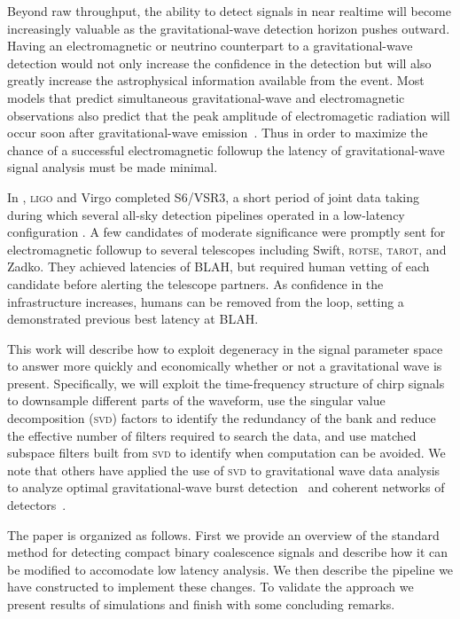 Beyond raw throughput, the ability to detect signals in near realtime will
become increasingly valuable as the gravitational-wave detection horizon pushes
outward.  Having an electromagnetic or neutrino counterpart to a
gravitational-wave detection would not only increase the confidence in the
detection but will also greatly increase the astrophysical information
available from the event. Most models that predict simultaneous
gravitational-wave and electromagnetic observations also predict that the peak
amplitude of electromagetic radiation will occur soon after gravitational-wave
emission~\cite{sylvestre2003}. Thus in order to maximize the chance of a
successful electromagnetic followup the latency of gravitational-wave signal
analysis must be made minimal.

In , \textsc{ligo} and Virgo completed S6/VSR3,
a short period of
joint data taking during which several all-sky detection pipelines operated in
a low-latency configuration \citeneeded. A few candidates of moderate
significance were promptly sent for electromagnetic followup \citeneeded{} to
several telescopes including Swift, \textsc{rotse}, \textsc{tarot}, and Zadko.
They achieved latencies of BLAH, but required human vetting of each candidate
before alerting the telescope partners. As confidence in the infrastructure
increases, humans can be removed from the loop, setting a demonstrated previous
best latency at BLAH.

This work will describe how to exploit degeneracy in the signal parameter space
to answer more quickly and economically whether or not a gravitational wave is
present.
Specifically, we will exploit the time-frequency structure of chirp
signals to downsample different parts of the waveform, use the singular value
decomposition (\textsc{svd}) factors to identify the redundancy of the bank and
reduce the effective number of filters required to search the data, and use
matched subspace filters built from \textsc{svd} to identify when computation
can be avoided.  We note that others have applied the use of \textsc{svd} to
gravitational wave data analysis to analyze optimal gravitational-wave burst
detection~\cite{bradyraymajumder2004, heng2008} and coherent networks of
detectors~\cite{wen2008}.

The paper is organized as follows.  First we provide an overview of the 
standard method for detecting compact binary coalescence signals and
describe how it can be modified to accomodate low latency analysis.  We
then describe the pipeline we have constructed to implement these changes.
To validate the approach we present results of simulations and finish
with some concluding remarks. 
